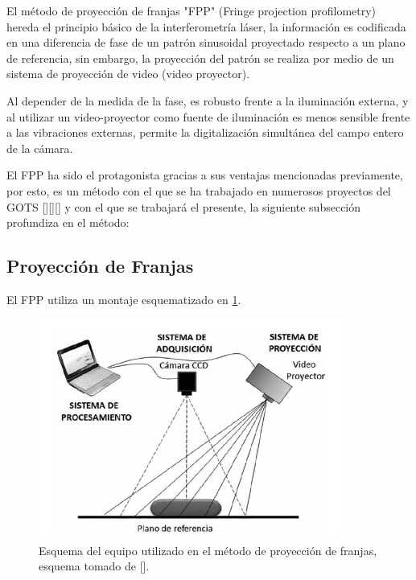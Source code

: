 \documentclass[UTF8]{article}
\begin{document}
El método de proyección de franjas "FPP" (Fringe projection profilometry) hereda el principio básico de la interferometría láser, la información es codificada en una diferencia de fase de un patrón sinusoidal proyectado respecto a un plano de referencia, sin embargo, la proyección del patrón se realiza por medio de un sistema de proyección de video (video proyector).

Al depender de la medida de la fase, es robusto frente a la iluminación externa, y al utilizar un video-proyector como fuente de iluminación es menos sensible frente a las vibraciones externas, permite la digitalización simultánea del campo entero de la cámara.

El FPP ha sido el protagonista gracias a sus ventajas mencionadas previamente, por esto, es un método con el que se ha trabajado en numerosos proyectos del GOTS [][][] y con el que se trabajará el presente, la siguiente subsección profundiza en el método:

\subsection{Proyección de Franjas}



El FPP utiliza un montaje esquematizado en \ref{im1}. 
\medskip

\begin{figure}[h!]
\includegraphics[width=10cm]{Montaje1.png}
\centering
\caption{Esquema del equipo utilizado en el método de proyección de franjas, esquema tomado de [].}
\label{im1}
\end{figure}
\end{document}
